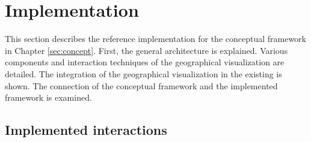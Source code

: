 \chapter{Implementation}\label{sec:implementation}


This section describes the reference implementation for the conceptual framework in Chapter \ref{sec:concept}.
First, the general architecture is explained.
Various components and interaction techniques of the geographical visualization are detailed.
The integration of the geographical visualization in the existing \visan{} is shown.
The connection of the conceptual framework and the implemented framework is examined.

\section{Implemented interactions}

